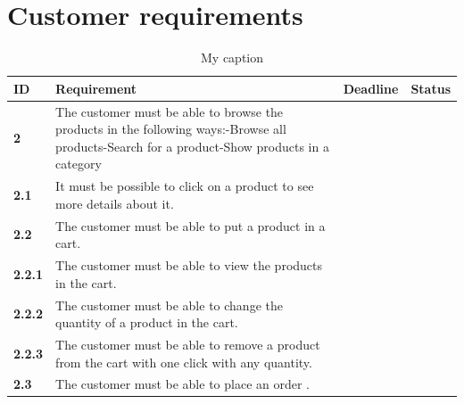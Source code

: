 \documentclass[a4paper,12pt]{article}
\begin{document}
\section{Customer requirements}
\begin{table}[]
	\centering
	\caption{My caption}
	\label{my-label}
	\begin{tabular}{|l|L{8cm}|L{2.5cm}|L{2.5cm}|}
		\hline
		\textbf{ID}    & \textbf{Requirement}                                                                                                                                                                          & Deadline & Status \\ \hline
		\textbf{2}     & The customer must be able to browse the products in the following ways:\newline -Browse all products\newline -Search for a product\newline -Show products in a category &          &        \\ \hline
		\textbf{2.1}   & It must be possible to click on a product to see more details about it.                                                                                                                       &          &        \\ \hline
		\textbf{2.2}   & The customer must be able to put a product in a cart.                                                                                                                                         &          &        \\ \hline
		\textbf{2.2.1} & The customer must be able to view the products in the cart.                                                                                                                                   &          &        \\ \hline
		\textbf{2.2.2} & The customer must be able to change the quantity of a product in the cart.                                                                                                                    &          &        \\ \hline
		\textbf{2.2.3} & The customer must be able to remove a product from the cart with one click with any quantity.                                                     &          &        \\ \hline
		\textbf{2.3}   & The customer must be able to place an order   .                                                                                                                                               &          &        \\ \hline

\end{tabular}
\end{table}
\end{document}
